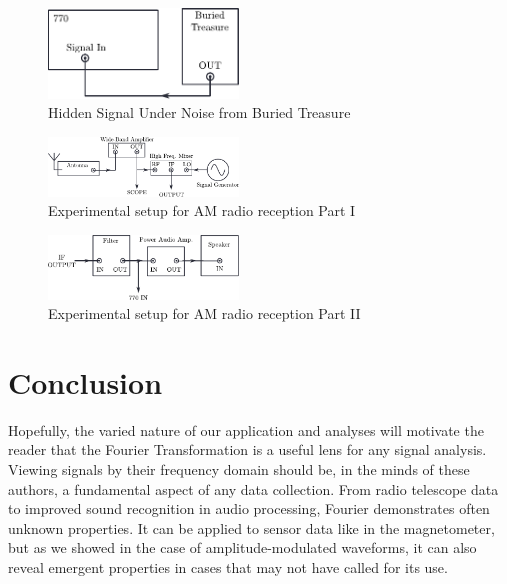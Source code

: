 \documentclass[prl,twocolumn,superscriptaddress,floatfix]{revtex4}
\begin{document}
\begin{figure}[H]
    \includegraphics[width=0.45\textwidth]{exp1_2.pdf}
    \caption{Hidden Signal Under Noise from Buried Treasure}
    \label{fig:exp2}
\end{figure}

\begin{figure}[H]
    \includegraphics[width=0.45\textwidth]{exp2_1.pdf}
    \caption{Experimental setup for AM radio reception Part I}
    \label{fig:AM1}
\end{figure}

\begin{figure}[H]
    \includegraphics[width=0.45\textwidth]{exp2_2.pdf}
    \caption{Experimental setup for AM radio reception Part II}
    \label{fig:AM2}
\end{figure}

\section{Conclusion}
Hopefully, the varied nature of our application and analyses will motivate the reader that the Fourier Transformation is a useful lens for any signal analysis.
Viewing signals by their frequency domain should be, in the minds of these authors, a fundamental aspect of any data collection.
From radio telescope data to improved sound recognition in audio processing, Fourier demonstrates often unknown properties.
It can be applied to sensor data like in the magnetometer, but as we showed in the case of amplitude-modulated waveforms, it can also reveal emergent properties in cases that may not have called for its use.


\nocite{Butz2015}

\end{document}
